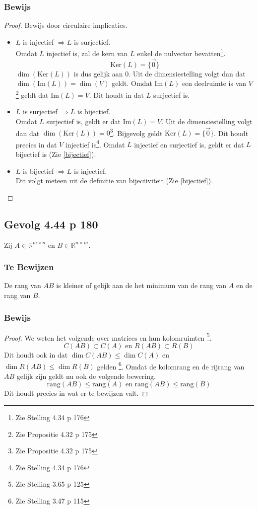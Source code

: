 \documentclass[lineaire_algebra_oplossingen.tex]{subfiles}
\begin{document}
\subsubsection*{Bewijs}
\begin{proof}
Bewijs door circulaire implicaties.
\begin{itemize}
\item $L$ is injectief $\Rightarrow L$ is surjectief.\\
Omdat $L$ injectief is, zal de kern van $L$ enkel de nulvector bevatten\footnote{Zie Stelling 4.34 p 176}.
\[\text{Ker}(L) = \{\vec{0}\}\]
$\dim (\text{Ker}(L))$ is dus gelijk aan $0$. Uit de dimensiestelling volgt dan dat $\dim (\text{Im}(L)) = \dim (V)$ geldt. Omdat $\text{Im}(L)$ een deelruimte is van $V$\footnote{Zie Propositie 4.32 p 175} geldt dat $\text{Im}(L) = V$. Dit houdt in dat $L$ surjectief is.

\item $L$ is surjectief $\Rightarrow L$ is bijectief.\\
Omdat $L$ surjectief is, geldt er dat $\text{Im}(L)=V$. Uit de dimensiestelling volgt dan dat $\dim (\text{Ker}(L)) = 0$\footnote{Zie Propositie 4.32 p 175}. Bijgevolg geldt $\text{Ker}(L) = \{\vec{0}\}$. Dit houdt precies in dat $V$ injectief is\footnote{Zie Stelling 4.34 p 176}. Omdat $L$ injectief en surjectief is, geldt er dat $L$ bijectief is (Zie \ref{bijectief}).

\item $L$ is bijectief $\Rightarrow L$ is injectief.\\
Dit volgt meteen uit de definitie van bijectiviteit (Zie \ref{bijectief}).
\end{itemize}
\end{proof}

\subsection{Gevolg 4.44 p 180}
\label{4.44}
Zij $A \in \mathbb{R}^{m\times n}$ en $B \in \mathbb{R}^{n\times m}$.

\subsubsection*{Te Bewijzen}
De rang van $AB$ is kleiner of gelijk aan de het minimum van de rang van $A$ en de rang van $B$.

\subsubsection*{Bewijs}
\begin{proof}
We weten het volgende over matrices en hun kolomruimten \footnote{Zie Stelling 3.65 p 125}.
\[
C(AB) \subset C(A) \text{ en } R(AB) \subset R(B)
\]
Dit houdt ook in dat $\dim C(AB) \le \dim C(A)$ en $\dim R(AB) \le \dim R(B)$ gelden \footnote{Zie Stelling 3.47 p 115}. Omdat de kolomrang en de rijrang van $AB$ gelijk zijn geldt nu ook de volgende bewering.
\[
\text{rang}(AB) \le \text{rang}(A) \text{ en } \text{rang}(AB) \le \text{rang}(B)
\]
Dit houdt precies in wat er te bewijzen valt.
\end{proof}
\end{document}
